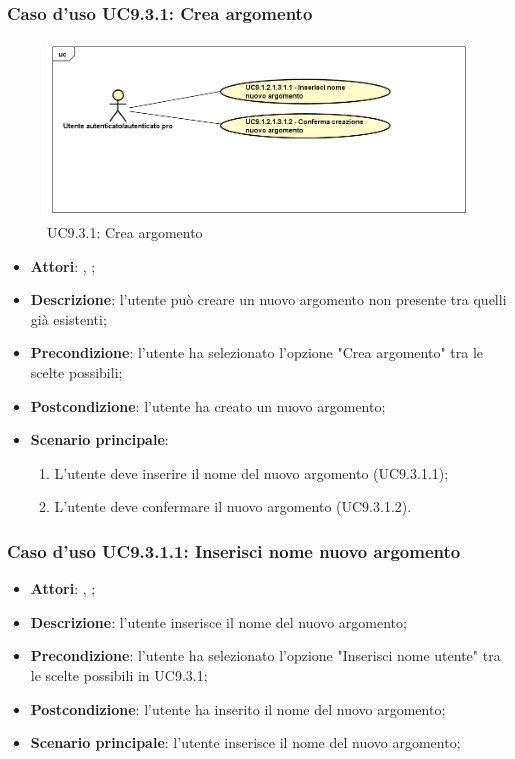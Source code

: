 		 \subsubsection{Caso d'uso UC9.3.1: Crea argomento}
		 \label{UC9.3.1}
		 \begin{figure}[h]
		 	\centering
		 	\includegraphics[scale=0.5,keepaspectratio]{UML/UC9_1_2_1_3_1.png}
		 	\caption{UC9.3.1: Crea argomento}
		 \end{figure}
		 \FloatBarrier
		 \begin{itemize}
		 	\item \textbf{Attori}: \uau, \uaupro;
		 	\item \textbf{Descrizione}: l'utente può creare un nuovo argomento non presente tra quelli già esistenti;
		 	\item \textbf{Precondizione}: l'utente ha selezionato l'opzione "Crea argomento" tra le scelte possibili;
		 	\item \textbf{Postcondizione}: l'utente ha creato un nuovo argomento; 
		 	\item \textbf{Scenario principale}:
		 	\begin{enumerate}
		 		\item L'utente deve inserire il nome del nuovo argomento (UC9.3.1.1);
		 		\item L'utente deve confermare il nuovo argomento (UC9.3.1.2).
		 	\end{enumerate}
		 \end{itemize}
		 
		 \subsubsection{Caso d'uso UC9.3.1.1: Inserisci nome nuovo argomento}
		 \label{UC9.3.1.1}
		 \begin{itemize}
		 	\item \textbf{Attori}: \uau, \uaupro;
		 	\item \textbf{Descrizione}: l'utente inserisce il nome del nuovo argomento;
		 	\item \textbf{Precondizione}: l'utente ha selezionato l'opzione "Inserisci nome utente" tra le scelte possibili in UC9.3.1;
		 	\item \textbf{Postcondizione}: l'utente ha inserito il nome del nuovo argomento;
		 	\item \textbf{Scenario principale}: l'utente inserisce il nome del nuovo argomento;
		 \end{itemize}
		 
